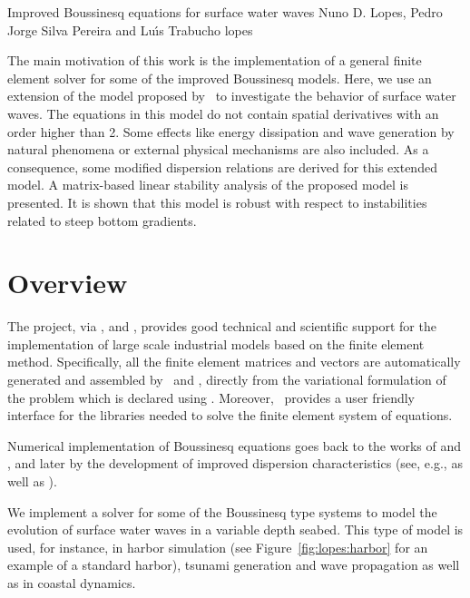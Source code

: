               {Improved Boussinesq equations for surface water waves}
              {Nuno D. Lopes, Pedro Jorge Silva Pereira and Lu{\'\i}s Trabucho}
              {lopes}

The main motivation of this work is the implementation of a general
finite element solver for some of the improved Boussinesq
models. Here, we use an extension of the
model proposed by~\citet{ZhaoTengCheng2004} to investigate the
behavior of surface water waves. The equations in this model do not
contain spatial derivatives with an order higher than 2. Some effects
like energy dissipation and wave generation by natural phenomena or
external physical mechanisms are also included.  As a consequence,
some modified dispersion relations are derived for this extended
model. A matrix-based linear stability analysis of the proposed model
is presented.  It is shown that this model is robust with respect to
instabilities related to steep bottom gradients.

\section{Overview}

The \fenics project, via \dolfin, \ufl and \ffc, provides good
technical and scientific support for the implementation of large scale
industrial models based on the finite element method. Specifically,
all the finite element matrices and vectors are automatically
generated and assembled by \dolfin\ and \ffc, directly from the
variational formulation of the problem which is declared using
\ufl. Moreover, \dolfin\ provides a user friendly interface for the
libraries needed to solve the finite element system of equations.

Numerical implementation of Boussinesq equations goes back to the
works of \citet{Peregrine1967} and \citet{Wu1981}, and later by the
development of improved dispersion characteristics (see, e.g.,
\citet{MadsenEtAl1991,Nwogu1993,ChenLiu1994} as well as
\citet{BejiNadaoka1996}).

We implement a solver for some of the Boussinesq type systems to model
the evolution of surface water waves in a variable
depth seabed.  This type of model is used, for instance, in harbor
simulation (see Figure~\ref{fig:lopes:harbor} for an example of a
standard harbor), tsunami generation and wave propagation as well as
in coastal dynamics.

